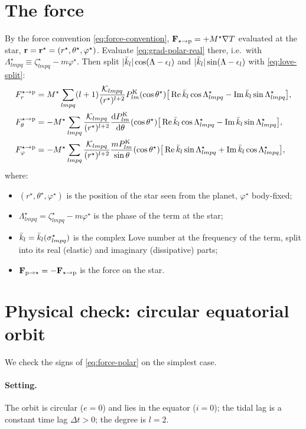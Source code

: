 \section{The force}
By the force convention \eqref{eq:force-convention}, $\mathbf F_{\star\to\mathrm p}=+M^\star\nabla T$ evaluated at the star, $\mathbf r=\mathbf r^\star=(r^\star,\theta^\star,\varphi^\star)$. Evaluate \eqref{eq:grad-polar-real} there, i.e.\ with $\Lambda^\star_{lmpq}\equiv\zeta^\star_{lmpq}-m\varphi^\star$. Then split $|\bar k_l|\cos(\Lambda-\epsilon_l)$ and $|\bar k_l|\sin(\Lambda-\epsilon_l)$ with \eqref{eq:love-split}:
\begin{equation}
  \begin{aligned}
  F^{\star\to\mathrm p}_r&=M^\star\sum_{lmpq}(l+1)\frac{\mathcal K_{lmpq}}{(r^\star)^{l+2}}P^{\mathrm K}_{lm}(\cos\theta^\star)\big[\operatorname{Re}\bar k_l\cos\Lambda^\star_{lmpq}-\operatorname{Im}\bar k_l\sin\Lambda^\star_{lmpq}\big],\\
  F^{\star\to\mathrm p}_\theta&=-M^\star\sum_{lmpq}\frac{\mathcal K_{lmpq}}{(r^\star)^{l+2}}\frac{\mathrm{d}P^{\mathrm K}_{lm}}{\mathrm{d}\theta}(\cos\theta^\star)\big[\operatorname{Re}\bar k_l\cos\Lambda^\star_{lmpq}-\operatorname{Im}\bar k_l\sin\Lambda^\star_{lmpq}\big],\\
  F^{\star\to\mathrm p}_\varphi&=-M^\star\sum_{lmpq}\frac{\mathcal K_{lmpq}}{(r^\star)^{l+2}}\frac{mP^{\mathrm K}_{lm}}{\sin\theta}(\cos\theta^\star)\big[\operatorname{Re}\bar k_l\sin\Lambda^\star_{lmpq}+\operatorname{Im}\bar k_l\cos\Lambda^\star_{lmpq}\big],
  \end{aligned} \label{eq:force-polar}
\end{equation}
where:
\begin{itemize}
  \item $(r^\star,\theta^\star,\varphi^\star)$ is the position of the star seen from the planet, $\varphi^\star$ body-fixed;
  \item $\Lambda^\star_{lmpq}=\zeta^\star_{lmpq}-m\varphi^\star$ is the phase of the term at the star;
  \item $\bar k_l=\bar k_l(\sigma^\star_{lmpq})$ is the complex Love number at the frequency of the term, split into its real (elastic) and imaginary (dissipative) parts;
  \item $\mathbf F_{\mathrm p\to\star}=-\mathbf F_{\star\to\mathrm p}$ is the force on the star.
\end{itemize}

\section{Physical check: circular equatorial orbit}\label{sec:physical-check}
We check the signs of \eqref{eq:force-polar} on the simplest case.
\paragraph{Setting.} The orbit is circular ($e=0$) and lies in the equator ($i=0$); the tidal lag is a constant time lag $\Delta t>0$; the degree is $l=2$.

